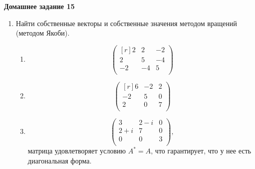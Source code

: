 \documentclass[12pt]{article}
\theoremstyle{definition}
\numberwithin{equation}{section}
\begin{document}
	\textbf{Домашнее задание 15}\begin{enumerate}
		\item Найти собственные векторы и собственные значения методом вращений (методом Якоби).
		\begin{enumerate}
			\item \[\begin{pmatrix}[r]
			2 & 2 & -2\\
			2 & 5 & -4\\
			-2 & -4 & 5\\
			\end{pmatrix}\]
			\item \[\begin{pmatrix}[r]
			6 & -2 & 2\\
			-2 & 5 & 0\\
			2 & 0 & 7\\
			\end{pmatrix}\]
			\item \[\begin{pmatrix}
			3 & 2-i & 0\\
			2+i & 7 & 0\\
			0 & 0 & 3\\
			\end{pmatrix},\] матрица удовлетворяет условию $A^*=A$, что гарантирует, что у нее есть диагональная форма.
		\end{enumerate}
	\end{enumerate}
	~\\
\end{document}
